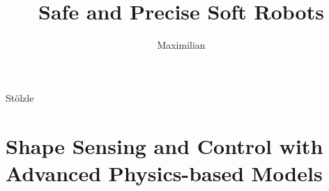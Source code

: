 \documentclass{dissertation}
\begin{document}
\title[Incorporating Physics into Learned Models for Control]{Safe and Precise Soft Robots}

\author{Maximilian}{Stölzle}

\frontmatter




\tableofcontents



\mainmatter

\thumbtrue






\part{Shape Sensing and Control with Advanced Physics-based Models}\label{part:physicsmodels}





\end{document}
